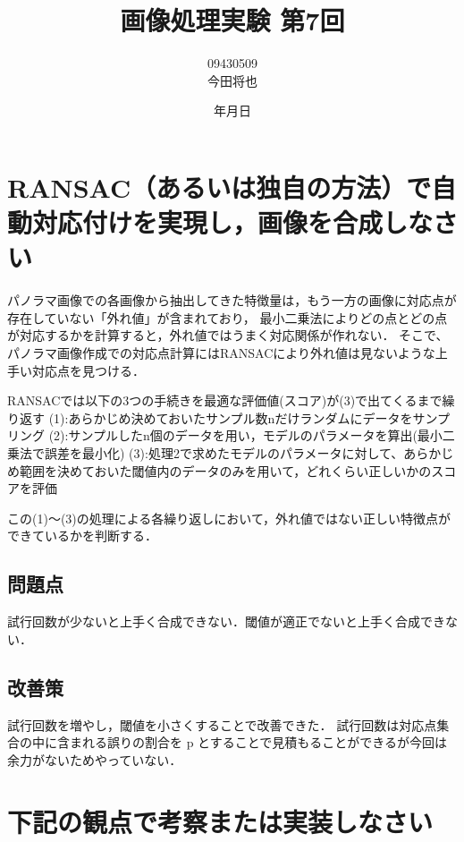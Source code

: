 \documentclass[11pt]{jarticle}
\begin{document}
\title{画像処理実験 第7回}
\author{09430509\\今田将也}
\date{\number\year 年\number\month 月\number\day 日}
\maketitle

\section{RANSAC（あるいは独自の方法）で自動対応付けを実現し，画像を合成しなさい}

パノラマ画像での各画像から抽出してきた特徴量は，もう一方の画像に対応点が存在していない「外れ値」が含まれており，
最小二乗法によりどの点とどの点が対応するかを計算すると，外れ値ではうまく対応関係が作れない．
そこで、パノラマ画像作成での対応点計算にはRANSACにより外れ値は見ないような上手い対応点を見つける．

RANSACでは以下の3つの手続きを最適な評価値(スコア)が(3)で出てくるまで繰り返す
(1):あらかじめ決めておいたサンプル数nだけランダムにデータをサンプリング
(2):サンプルしたn個のデータを用い，モデルのパラメータを算出(最小二乗法で誤差を最小化)
(3):処理2で求めたモデルのパラメータに対して、あらかじめ範囲を決めておいた閾値内のデータのみを用いて，どれくらい正しいかのスコアを評価

この(1)～(3)の処理による各繰り返しにおいて，外れ値ではない正しい特徴点ができているかを判断する．

\subsection{問題点}
試行回数が少ないと上手く合成できない．閾値が適正でないと上手く合成できない．

\subsection{改善策}
試行回数を増やし，閾値を小さくすることで改善できた．
試行回数は対応点集合の中に含まれる誤りの割合を p とすることで見積もることができるが今回は余力がないためやっていない．

\section{下記の観点で考察または実装しなさい}
\end{document}
